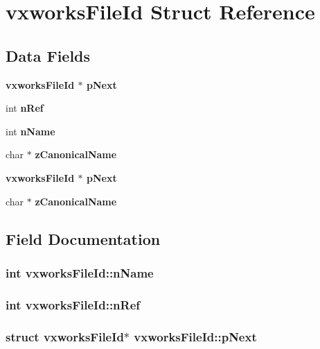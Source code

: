 \section{vxworks\-File\-Id Struct Reference}
\label{structvxworksFileId}
\subsection*{Data Fields}
\begin{CompactItemize}
\item 
\bf{vxworks\-File\-Id} $\ast$ \bf{p\-Next}
\item 
int \bf{n\-Ref}
\item 
int \bf{n\-Name}
\item 
char $\ast$ \bf{z\-Canonical\-Name}
\item 
\bf{vxworks\-File\-Id} $\ast$ \bf{p\-Next}
\item 
char $\ast$ \bf{z\-Canonical\-Name}
\end{CompactItemize}


\subsection{Field Documentation}
\subsubsection{\setlength{\rightskip}{0pt plus 5cm}int \bf{vxworks\-File\-Id::n\-Name}}\label{structvxworksFileId_dac21a729e9329c3dd384730d14b07e9}


\subsubsection{\setlength{\rightskip}{0pt plus 5cm}int \bf{vxworks\-File\-Id::n\-Ref}}\label{structvxworksFileId_b5805abe45eb2d05067774b1b5283d59}


\subsubsection{\setlength{\rightskip}{0pt plus 5cm}struct \bf{vxworks\-File\-Id}$\ast$ \bf{vxworks\-File\-Id::p\-Next}}\label{structvxworksFileId_de58ed00acaed258779a5f22c97eda29}


